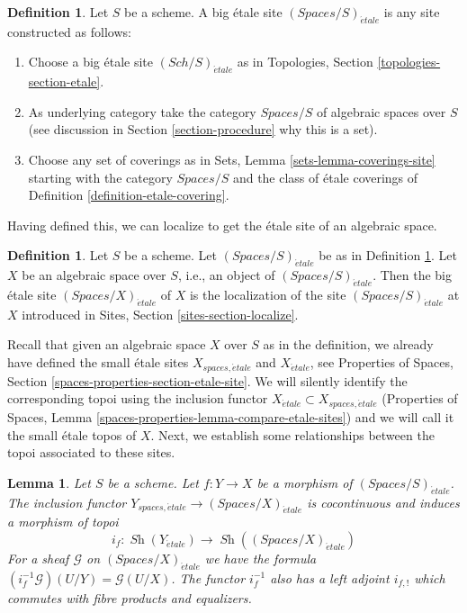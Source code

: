 \documentclass{stacks-project}
\theoremstyle{plain}
\newtheorem{lemma}[subsection]{Lemma}
\theoremstyle{definition}
\newtheorem{definition}[subsection]{Definition}
\theoremstyle{remark}
\numberwithin{equation}{subsection}
\def\Sch{\mathit{Sch}}
\def\Sh{\mathop{\mathit{Sh}}\nolimits}
\def\etale{{\acute{e}tale}}
\begin{document}
\begin{definition}
\label{definition-big-etale-site}
Let $S$ be a scheme. A big \'etale site {\it $(\textit{Spaces}/S)_\etale$}
is any site constructed as follows:
\begin{enumerate}
\item Choose a big \'etale site $(\Sch/S)_\etale$ as in
Topologies, Section \ref{topologies-section-etale}.
\item As underlying category take the category $\textit{Spaces}/S$
of algebraic spaces over $S$ (see discussion in
Section \ref{section-procedure} why this is a set).
\item Choose any set of coverings as in
Sets, Lemma \ref{sets-lemma-coverings-site} starting with the
category $\textit{Spaces}/S$ and the class of \'etale coverings
of Definition \ref{definition-etale-covering}.
\end{enumerate}
\end{definition}

\noindent
Having defined this, we can localize to get the \'etale
site of an algebraic space.

\begin{definition}
\label{definition-big-small-etale}
Let $S$ be a scheme. Let $(\textit{Spaces}/S)_\etale$ be as in
Definition \ref{definition-big-etale-site}.
Let $X$ be an algebraic space over $S$, i.e., an object of
$(\textit{Spaces}/S)_\etale$. Then the big \'etale site
{\it $(\textit{Spaces}/X)_\etale$} of $X$
is the localization of the site $(\textit{Spaces}/S)_\etale$
at $X$ introduced in Sites, Section \ref{sites-section-localize}.
\end{definition}

\noindent
Recall that given an algebraic space $X$ over $S$ as in
the definition, we already have defined the small \'etale sites
$X_{spaces, \etale}$ and $X_\etale$, see
Properties of Spaces, Section \ref{spaces-properties-section-etale-site}.
We will silently identify the corresponding topoi using
the inclusion functor $X_\etale \subset X_{spaces, \etale}$
(Properties of Spaces, Lemma \ref{spaces-properties-lemma-compare-etale-sites})
and we will call it the small \'etale topos of $X$.
Next, we establish some relationships between the topoi
associated to these sites.

\begin{lemma}
\label{lemma-put-in-T-etale}
Let $S$ be a scheme. Let $f : Y \to X$ be a morphism of
$(\textit{Spaces}/S)_\etale$. The inclusion functor
$Y_{spaces, \etale} \to (\textit{Spaces}/X)_\etale$
is cocontinuous and induces a morphism of topoi
$$
i_f :
\Sh(Y_\etale)
\longrightarrow
\Sh((\textit{Spaces}/X)_\etale)
$$
For a sheaf $\mathcal{G}$ on $(\textit{Spaces}/X)_\etale$
we have the formula $(i_f^{-1}\mathcal{G})(U/Y) = \mathcal{G}(U/X)$.
The functor $i_f^{-1}$ also has a left adjoint $i_{f, !}$ which commutes
with fibre products and equalizers.
\end{lemma}
\end{document}
